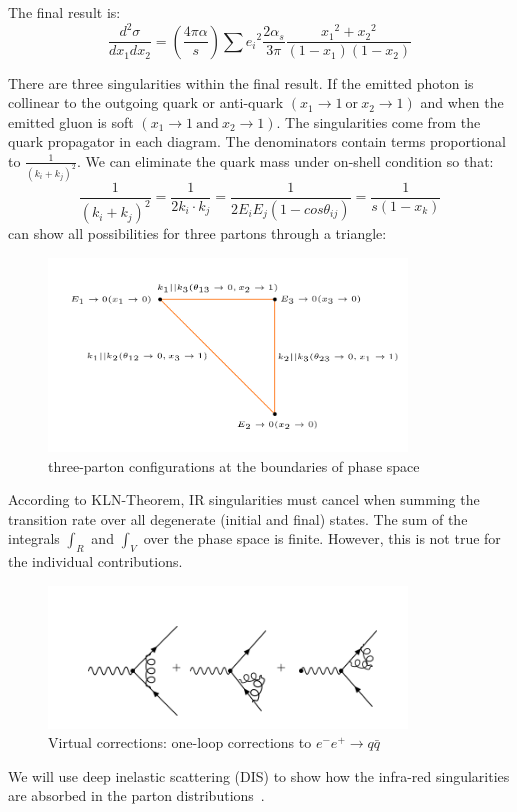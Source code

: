 The final result is:
\begin{equation}
\frac{d^2 \sigma}{dx_1 dx_2}= (\frac{4\pi \alpha}{s})\sum {e_i}^2 
\frac{2\alpha_s}{3\pi} \frac{{x_1}^2+{x_2}^2}{(1-x_1)(1-x_2)}
\end{equation}

There are three singularities within the final result. 
If the emitted photon is collinear to the outgoing quark or anti-quark $ (x_1 \rightarrow 1 \:\text{or}\: x_2 \rightarrow 1) $ and when the emitted gluon is soft $ (x_1 \rightarrow 1\: \text{and}\: x_2 \rightarrow 1 )$.
The singularities come from the quark propagator in each diagram. The denominators contain terms proportional to $ \frac{1}{(k_i + k_j)^2}  $. We can eliminate the quark mass under on-shell condition so that:
\begin{equation}
\frac{1}{(k_i + k_j)^2}=\frac{1}{2k_i \cdot k_j}=\frac{1}{2E_iE_j(1-cos\theta_{ij})}=\frac{1}{s(1- x_k)}
\end{equation} 
can show all possibilities for three partons through a triangle:

\begin{figure}[h!]
\centering
\includegraphics[width=0.85\textwidth]{images/Intro/triangle.png}
\caption{three-parton configurations at the boundaries
of phase space}
\end{figure}

According to KLN-Theorem, IR singularities must cancel when summing the transition rate over all degenerate (initial and final) states.
The sum of the integrals $ \int_R $ and $ \int_V $ over the phase space is finite. However, this is not true for the
individual contributions.
\begin{figure}[ht!]
\centering
\includegraphics[width=0.85\textwidth]{images/Intro/virtual.png}
\caption{Virtual corrections: one-loop corrections to $  e^- e^+ \rightarrow q\bar{q} $}
\end{figure}
We will use deep inelastic scattering (DIS) to show how the infra-red singularities are absorbed in the parton distributions~\cite{Cunha13}.

